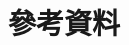 \chapter{參考資料}
\renewcommand{\baselinestretch}{10} %
\par
\renewcommand{\baselinestretch}{1} %
\twelve \qquad 
\par
